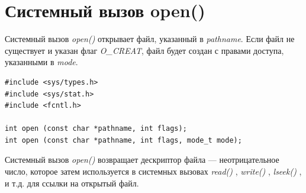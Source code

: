 \chapter{Системный вызов open()}
Системный вызов \textit{open()} открывает файл, указанный в \textit{pathname}.
Если файл не существует и указан флаг \textit{O\_CREAT}, файл будет создан с правами доступа, указанными в \textit{mode}.

\begin{lstlisting}
#include <sys/types.h>
#include <sys/stat.h>
#include <fcntl.h>

int open (const char *pathname, int flags);
int open (const char *pathname, int flags, mode_t mode);
\end{lstlisting}

Системный вызов \textit{open()} возвращает дескриптор файла --- неотрицательное число, которое затем используется в системных вызовах \textit{read()} , \textit{write()} , \textit{lseek()} , и т.д. для ссылки на открытый файл.

